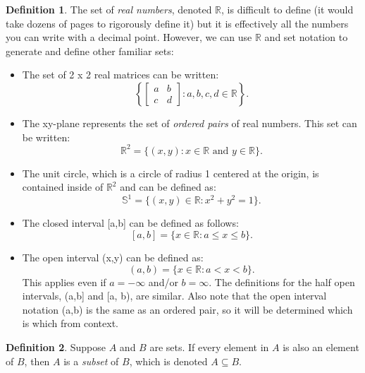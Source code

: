 \documentclass{amsart} %
\theoremstyle{definition} %
\newtheorem*{dfn}{Definition} %
\theoremstyle{proposition} %
\theoremstyle{remark} %
\begin{document}
\begin{dfn}
 \quad The set of \emph{real numbers}, denoted $\mathbb{R}$, is difficult to define (it would take dozens of pages to rigorously define it) but it is effectively all the numbers you can write with a decimal point. However, we can use $\mathbb{R}$ and set notation to generate and define other familiar sets:

    \begin{itemize}
      \item The set of 2 x 2 real matrices can be written:
            $$ \left\{\begin{bmatrix}
                  a & b \\
                  c & d
                \end{bmatrix} : a, b, c, d \in \mathbb{R}\right\}. $$ %
      \item The xy-plane represents the set of \emph{ordered pairs} of real numbers. This set can be written:
            \[ \mathbb{R}^2 = \{(x,y) : x \in \mathbb{R} \text{ and } y \in \mathbb{R}\}. \]
      \item The unit circle, which is a circle of radius 1 centered at the origin, is contained inside of $\mathbb{R}^2$ and can be defined as:
            \[ \mathbb{S}^1 = \{(x,y) \in \mathbb{R} : x^2 + y^2 = 1\}.  \]
      \item The closed interval [a,b] can be defined as follows:
            \[ [a,b] = \{x \in \mathbb{R} : a \le x \le b\}.  \]
      \item The open interval (x,y) can be defined as:
            \[ (a,b) = \{x \in \mathbb{R} : a < x < b\}. \]
            This applies even if $a = -\infty$ and/or $b = \infty$. The definitions for the half open intervals, (a,b] and [a, b), are similar. Also note that the           open interval notation (a,b) is the same as an ordered pair, so it will be determined which is which from context.
    \end{itemize}

\end{dfn}

\begin{dfn}
\boxed{\subseteq} \quad Suppose $A$ and $B$ are sets. If every element in $A$ is also an element of $B$, then $A$ is a \emph{subset} of $B$, which is denoted $A \subseteq B$.
\end{dfn}
\end{document}
